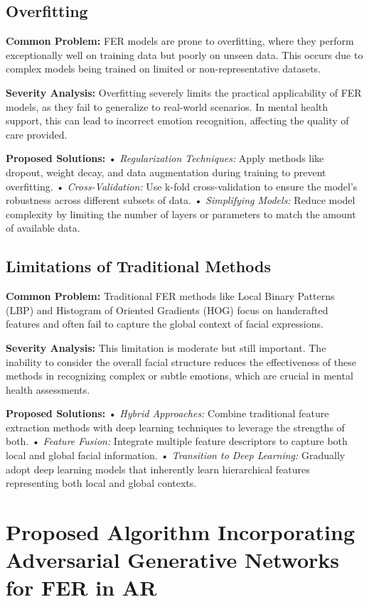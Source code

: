 \documentclass[lettersize,journal]{IEEEtran}
\begin{document}
\subsection{Overfitting}

\textbf{Common Problem:} FER models are prone to overfitting, where they perform exceptionally well on training data but poorly on unseen data. This occurs due to complex models being trained on limited or non-representative datasets.

\textbf{Severity Analysis:} Overfitting severely limits the practical applicability of FER models, as they fail to generalize to real-world scenarios. In mental health support, this can lead to incorrect emotion recognition, affecting the quality of care provided.

\textbf{Proposed Solutions:}
	•	\emph{Regularization Techniques:} Apply methods like dropout, weight decay, and data augmentation during training to prevent overfitting.
	•	\emph{Cross-Validation:} Use k-fold cross-validation to ensure the model’s robustness across different subsets of data.
	•	\emph{Simplifying Models:} Reduce model complexity by limiting the number of layers or parameters to match the amount of available data.

\subsection{Limitations of Traditional Methods}

\textbf{Common Problem:} Traditional FER methods like Local Binary Patterns (LBP) and Histogram of Oriented Gradients (HOG) focus on handcrafted features and often fail to capture the global context of facial expressions.


\textbf{Severity Analysis:} This limitation is moderate but still important. The inability to consider the overall facial structure reduces the effectiveness of these methods in recognizing complex or subtle emotions, which are crucial in mental health assessments.

\textbf{Proposed Solutions:}
	•	\emph{Hybrid Approaches:} Combine traditional feature extraction methods with deep learning techniques to leverage the strengths of both.
	•	\emph{Feature Fusion:} Integrate multiple feature descriptors to capture both local and global facial information.
	•	\emph{Transition to Deep Learning:} Gradually adopt deep learning models that inherently learn hierarchical features representing both local and global contexts.

\section{Proposed Algorithm Incorporating Adversarial Generative Networks for FER in AR}
\label{sec:proposed_algorithm_gan}
\end{document}

